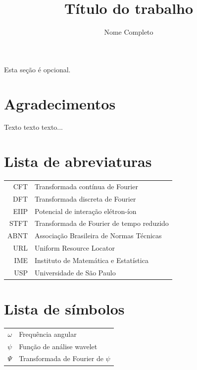\documentclass[a4paper,12pt,twoside,english,brazilian]{book}
\title{Título do trabalho}[um subtítulo]
\author[fem]{Nome Completo}
\begin{document}
\frontmatter
\pagestyle{plain}
\onehalfspacing
\maketitle

\begin{dedicatoria}
Esta seção é opcional.
\end{dedicatoria}


\chapter*{Agradecimentos}
Texto texto texto...



\newcommand\disablenewpage[1]{{\let\clearpage\par\let\cleardoublepage\par #1}}
\bgroup
\raggedbottom

\disablenewpage{\chapter*{Lista de abreviaturas}}
\begin{tabular}{rl}
   CFT & Transformada contínua de Fourier\\
   DFT & Transformada discreta de Fourier\\
  EIIP & Potencial de interação elétron-íon\\
  STFT & Transformada de Fourier de tempo reduzido\\
  ABNT & Associação Brasileira de Normas Técnicas\\
   URL & Uniform Resource Locator\\
   IME & Instituto de Matemática e Estatística\\
   USP & Universidade de São Paulo
\end{tabular}

\disablenewpage{\chapter*{Lista de símbolos}}
\begin{tabular}{rl}
  $\omega$ & Frequência angular\\
  $\psi$ & Função de análise wavelet\\
  $\Psi$ & Transformada de Fourier de $\psi$\\
\end{tabular}
\end{document}
